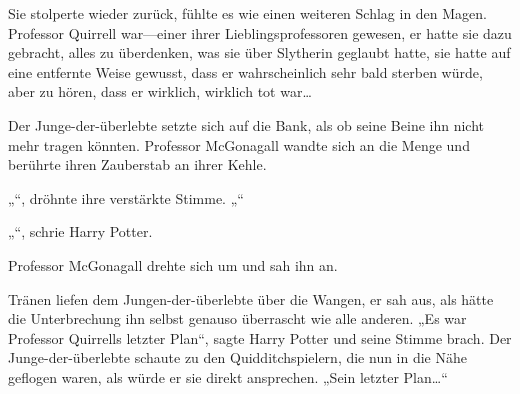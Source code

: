 Sie stolperte wieder zurück, fühlte es wie einen weiteren Schlag in den Magen.
Professor Quirrell war—einer ihrer Lieblingsprofessoren gewesen, er hatte sie dazu gebracht, alles zu überdenken, was sie über Slytherin geglaubt hatte, sie hatte auf eine entfernte Weise gewusst, dass er wahrscheinlich sehr bald sterben würde, aber zu hören, dass er wirklich, wirklich tot war…

Der Junge-der-überlebte setzte sich auf die Bank, als ob seine Beine ihn nicht mehr tragen könnten. Professor McGonagall wandte sich an die Menge und berührte ihren Zauberstab an ihrer Kehle.

„“, dröhnte ihre verstärkte Stimme. „“

„“, schrie Harry Potter.

Professor McGonagall drehte sich um und sah ihn an.

Tränen liefen dem Jungen-der-überlebte über die Wangen, er sah aus, als hätte die Unterbrechung ihn selbst genauso überrascht wie alle anderen.
„Es war Professor Quirrells letzter Plan“, sagte Harry Potter und seine Stimme brach. Der Junge-der-überlebte schaute zu den Quidditchspielern, die nun in die Nähe geflogen waren, als würde er sie direkt ansprechen.
„Sein letzter Plan…“

